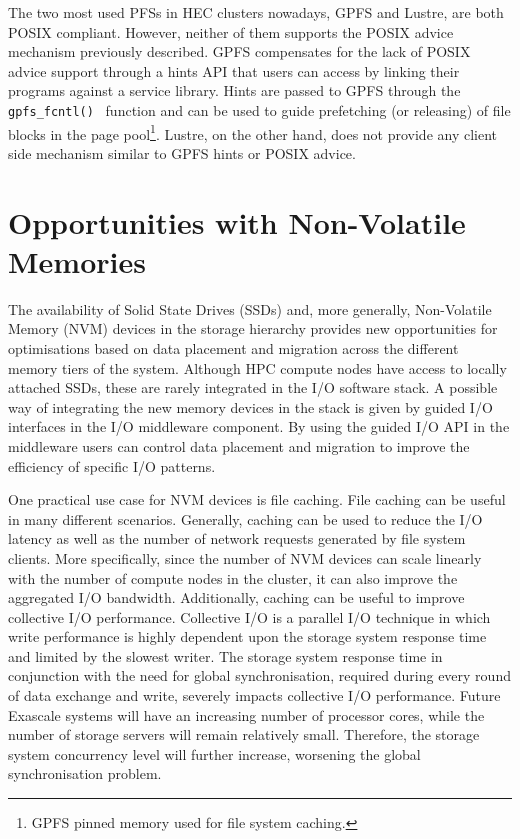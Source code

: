 The two most used PFSs in HEC clusters nowadays, GPFS and Lustre, are both POSIX compliant. However, neither of them supports the POSIX advice mechanism previously described. GPFS compensates for the lack of POSIX advice support through a hints API that users can access by linking their programs against a service library. Hints are passed to GPFS through the \texttt{gpfs\_fcntl()}~\cite{GPFSHINTS} function and can be used to guide prefetching (or releasing) of file blocks in the page pool\footnote{GPFS pinned memory used for file system caching.}. Lustre, on the other hand, does not provide any client side mechanism similar to GPFS hints or POSIX advice.

\section{Opportunities with Non-Volatile Memories} \label{sec: nvm}
The availability of Solid State Drives (SSDs) and, more generally, Non-Volatile Memory (NVM) devices in the storage hierarchy provides new opportunities for optimisations based on data placement and migration across the different memory tiers of the system. Although HPC compute nodes have access to locally attached SSDs, these are rarely integrated in the I/O software stack. A possible way of integrating the new memory devices in the stack is given by guided I/O interfaces in the I/O middleware component. By using the guided I/O API in the middleware users can control data placement and migration to improve the efficiency of specific I/O patterns.

One practical use case for NVM devices is file caching. File caching can be useful in many different scenarios. Generally, caching can be used to reduce the I/O latency as well as the number of network requests generated by file system clients. More specifically, since the number of NVM devices can scale linearly with the number of compute nodes in the cluster, it can also improve the aggregated I/O bandwidth. Additionally, caching can be useful to improve collective I/O performance. Collective I/O is a parallel I/O technique in which write performance is highly dependent upon the storage system response time and limited by the slowest writer. The storage system response time in conjunction with the need for global synchronisation, required during every round of data exchange and write, severely impacts collective I/O performance. Future Exascale systems will have an increasing number of processor cores, while the number of storage servers will remain relatively small. Therefore, the storage system concurrency level will further increase, worsening the global synchronisation problem.

